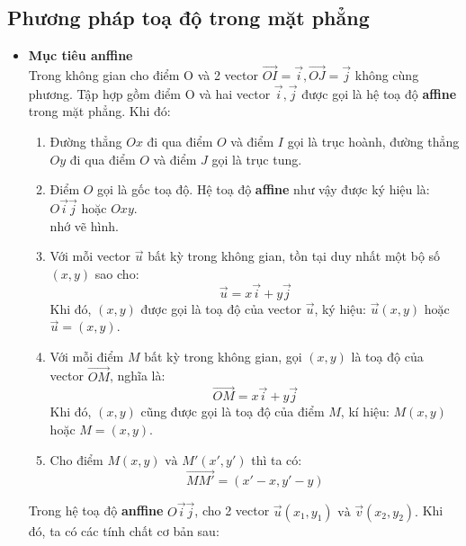 \documentclass[12pt,a4]{article}
\begin{document}
\begin{titlepage}
\subsection{Phương pháp toạ độ trong mặt phẳng}
\begin{itemize}
    \item \textbf{Mục tiêu anffine}\\
    Trong không gian cho điểm O và 2 vector $\vec{OI} = \vec{i}, \vec{OJ} = \vec{j}$ không cùng phương. Tập hợp gồm điểm O và hai vector $\vec{i},\vec{j}$ được gọi là hệ toạ độ \textbf{affine} trong mặt phẳng. Khi đó:\\
    \begin{enumerate}
        \item Đường thẳng $Ox$ đi qua điểm $O$ và điểm $I$ gọi là trục hoành, đường thẳng $Oy$ đi qua điểm $O$ và điểm $J$ gọi là trục tung.\\
        \item Điểm $O$ gọi là gốc toạ độ. Hệ toạ độ \textbf{affine} như vậy được ký hiệu là: $O\vec{i}\vec{j}$ hoặc $Oxy$.\\
        nhớ vẽ hình.
        \item Với mỗi vector $\vec{u}$ bất kỳ trong không gian, tồn tại duy nhất một bộ số $(x,y)$ sao cho:
        \[
            \vec{u} = x\vec{i} + y\vec{j}
        \]
        Khi đó, $(x,y)$ được gọi là toạ độ của vector $\vec{u}$, ký hiệu: $\vec{u}(x,y)$ hoặc $\vec{u} = (x,y)$.
        \item Với mỗi điểm $M$ bất kỳ trong không gian, gọi $(x,y)$ là toạ độ của vector $\overrightarrow{OM}$, nghĩa là:
        \[
            \overrightarrow{OM} = x\vec{i} + y\vec{j}
        \]
        Khi đó, $(x,y)$ cũng được gọi là toạ độ của điểm $M$, kí hiệu: $M(x,y)$ hoặc $M = (x,y)$.
        \item Cho điểm $M(x,y) \text{ và } M'(x',y')$ thì ta có:
        \[
            \overrightarrow{MM'} = (x' - x, y' - y)
        \]
    \end{enumerate} 
    Trong hệ toạ độ \textbf{anffine} $O\vec{i}\vec{j}$, cho 2 vector $\vec{u}(x_1,y_1) \text{ và } \vec{v}(x_2,y_2).$ Khi đó, ta có các tính chất cơ bản sau:\\
\end{itemize}
\end{titlepage}
\end{document}
